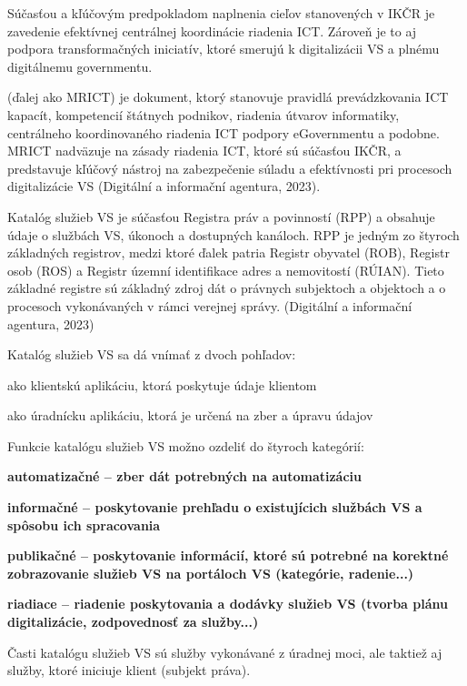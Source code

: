 Súčasťou a kľúčovým predpokladom naplnenia cieľov stanovených v IKČR je zavedenie efektívnej centrálnej koordinácie riadenia ICT. Zároveň je to aj podpora transformačných iniciatív, ktoré smerujú k digitalizácii VS a plnému digitálnemu governmentu.

 (ďalej ako MRICT) je dokument, ktorý stanovuje pravidlá prevádzkovania ICT kapacít, kompetencií štátnych podnikov, riadenia útvarov informatiky, centrálneho koordinovaného riadenia ICT podpory eGovernmentu a podobne. MRICT nadväzuje na zásady riadenia ICT, ktoré sú súčasťou IKČR, a predstavuje kľúčový nástroj na zabezpečenie súladu a efektívnosti pri procesoch digitalizácie VS \scr(Digitální a informační agentura, 2023).

Katalóg služieb VS je súčasťou Registra práv a povinností (RPP) a obsahuje údaje o službách VS, úkonoch a dostupných kanáloch. RPP je jedným zo štyroch základných registrov, medzi ktoré ďalek patria Registr obyvatel (ROB), Registr osob (ROS) a Registr územní identifikace adres a nemovitostí (RÚIAN). Tieto základné registre sú základný zdroj dát o právnych subjektoch a objektoch a o procesoch vykonávaných v rámci verejnej správy. \scr(Digitální a informační agentura, 2023)

Katalóg služieb VS sa dá vnímať z dvoch pohľadov:

\startitemize[a]
\item{ako klientskú aplikáciu, ktorá poskytuje údaje klientom}
\item{ako úradnícku aplikáciu, ktorá je určená na zber a úpravu údajov}
\stopitemize

Funkcie katalógu služieb VS možno ozdeliť do štyroch kategórií:

\startitemize
\item{\start \bf automatizačné \stop – zber dát potrebných na automatizáciu}
\item{\start \bf informačné \stop – poskytovanie prehľadu o existujícich službách VS a spôsobu ich spracovania}
\item{\start \bf publikačné \stop – poskytovanie informácií, ktoré sú potrebné na korektné zobrazovanie služieb VS na portáloch VS (kategórie, radenie...)}
\item{\start \bf riadiace \stop – riadenie poskytovania a dodávky služieb VS (tvorba plánu digitalizácie, zodpovednosť za služby...)}
\stopitemize

Časti katalógu služieb VS sú služby vykonávané z úradnej moci, ale taktiež aj služby, ktoré iniciuje klient (subjekt práva). 


